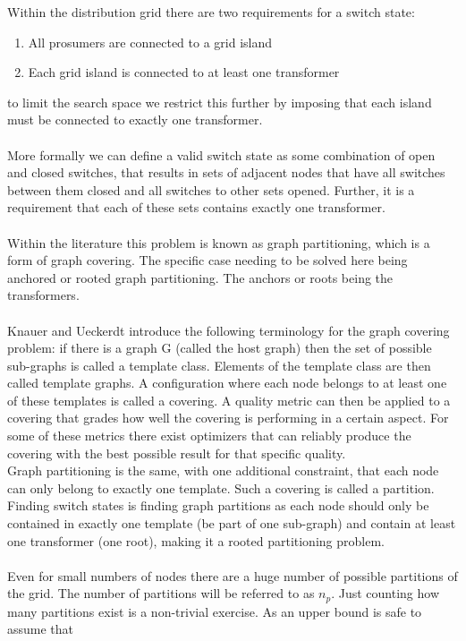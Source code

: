 Within the distribution grid there are two requirements for a switch
state:

\begin{enumerate}
    \item All prosumers are connected to a grid island
    \item Each grid island is connected to at least one transformer
\end{enumerate}

to limit the search space we restrict this further by imposing that each
island must be connected to exactly one transformer.\\
\\
More formally we can define a valid switch state
as some combination of open and closed switches,
that results in sets of adjacent nodes that have all switches
between them closed and all switches to other
sets opened. Further, it is a requirement that each of
these sets contains exactly one transformer.\\
\\
Within the literature this problem is known as graph partitioning, which is a form
of graph covering. 
The specific case needing to be solved here being anchored or 
rooted graph partitioning\autocite{graph_partitioning}. The anchors
or roots being the transformers.\\
\\
Knauer and Ueckerdt\autocite{graph_covering_terminology}
introduce the following terminology for the graph covering problem:
if there is a graph G (called
the host graph) then the set of possible sub-graphs is called a template class.
Elements of the template class are then called template graphs. A configuration 
where each node belongs to at least
one of these templates is called a covering. A quality metric can then be applied to a covering
that grades how well the covering is performing in a certain aspect. For some of these metrics
there exist optimizers that can reliably produce the covering with the best possible result for that
specific quality.\\
Graph partitioning is the same, with one additional constraint, that each node can only belong
to exactly one template. Such a covering is called a partition.\\
Finding switch states is finding graph partitions as each node should only
be contained in exactly one template (be part of one sub-graph) and contain at least
one transformer (one root), making it a rooted partitioning problem.\\
\\
Even for small numbers of nodes there are a huge number of possible partitions
of the grid.
The number of partitions will be referred to as $n_p$.
Just counting how many partitions exist is a non-trivial exercise.
As an upper bound is safe
to assume that

